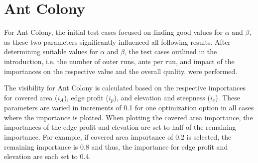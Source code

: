 \section{Ant Colony}
%
%
%	


For Ant Colony, the initial test cases focused on finding good values for $\alpha$ and $\beta$, as these two parameters significantly influenced all following results.
After determining suitable values for $\alpha$ and $\beta$, the test cases outlined in the introduction, i.e. the number of outer runs, ants per run, and impact of the importances on the respective value and the overall quality, were performed.

The visibility for Ant Colony is calculated based on the respective importances for covered area ($i_A$), edge profit ($i_p$), and elevation and steepness ($i_e$).
These parameters are varied in increments of 0.1 for one optimization option in all cases where the importance is plotted.
When plotting the covered area importance, the importances of the edge profit and elevation are set to half of the remaining importance.
For example, if covered area importance of 0.2 is selected, the remaining importance is 0.8 and thus, the importance for edge profit and elevation are each set to 0.4.



